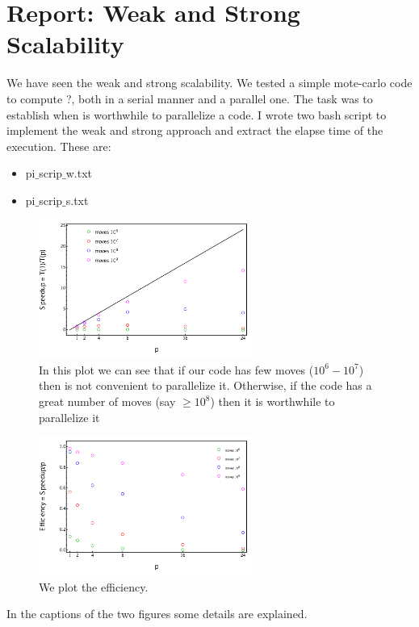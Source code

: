 \documentclass[a4paper,9pt, english]{report}
\theoremstyle{plain}
\theoremstyle{definition}
\theoremstyle{remark}
\begin{document}
\section{Report: Weak and Strong Scalability}

We have seen the weak and strong scalability. We tested a simple mote-carlo code to compute ?, both in a serial manner and a parallel one. The task was to establish when is worthwhile to parallelize a code. I wrote two bash script to implement the weak and strong approach and extract the elapse time of the execution. These are:
\begin{itemize}
\item pi$\_$scrip$\_$w.txt
\item pi$\_$scrip$\_$s.txt
\end{itemize}

 \begin{figure}
\begin{center}
\includegraphics[width=7cm]{speedup.pdf}
\end{center}
\caption{In this plot we can see that if our code has few moves ($10^6 - 10^7$) then is not convenient to parallelize it. Otherwise, if the code has a great number of moves (say $\geq 10^8$) then it is worthwhile to parallelize it}
\label{fig: speedup}
\end{figure}

 \begin{figure}
\begin{center}
\includegraphics[width=7cm]{eff.pdf}
\end{center}
\caption{We plot the efficiency.}
\label{fig: eff}
\end{figure}


In the captions of the two figures some details are explained.
\end{document}
